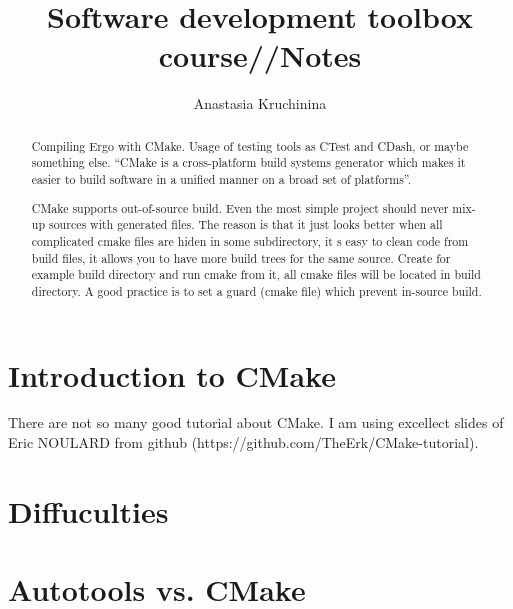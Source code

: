 \documentclass[a4paper,10pt]{article}
\title{Software development toolbox course//Notes}
\author{Anastasia Kruchinina}
\begin{document}
\maketitle

\begin{abstract}
Compiling Ergo with CMake. Usage of testing tools as CTest and CDash, or maybe something else.
``CMake is a cross-platform build systems generator which makes
it easier to build software in a unified manner on a broad set
of platforms''.


CMake supports out-of-source build.
Even the most simple project should never mix-up sources with
generated files. The reason is that it just looks better when all complicated cmake files are hiden in some subdirectory, it s easy to clean code from build files, it allows you to have more build trees for the same source.
Create for example build directory and run cmake from it, all cmake files will be located in build directory.
A good practice is to set a guard (cmake file) which prevent in-source build.




\end{abstract}

\section{Introduction to CMake}

There are not so many good tutorial about CMake. I am using excellect slides of Eric NOULARD from github (https://github.com/TheErk/CMake-tutorial).


\section{Diffuculties}


\section{Autotools vs. CMake}
\end{document}
